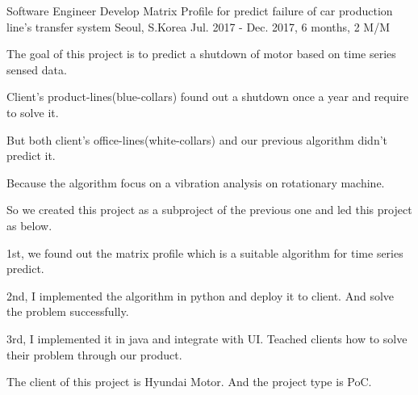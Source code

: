 \begin{cventries}
  \cventry
    {Software Engineer} %
    {Develop Matrix Profile for predict failure of car production line's transfer system} %
    {Seoul, S.Korea} %
    {Jul. 2017 - Dec. 2017, 6 months, 2 M/M} %
    {
      \begin{cvitems} %
        \item {The goal of this project is to predict a shutdown of motor based on time series sensed data.}
        \item {Client's product-lines(blue-collars) found out a shutdown once a year and require to solve it.}
        \item {But both client's office-lines(white-collars) and our previous algorithm didn't predict it.}
        \item {Because the algorithm focus on a vibration analysis on rotationary machine.}
        \item {So we created this project as a subproject of the previous one and led this project as below.}
        \item {1st, we found out the matrix profile which is a suitable algorithm for time series predict.}
        \item {2nd, I implemented the algorithm in python and deploy it to client. And solve the problem successfully.}
        \item {3rd, I implemented it in java and integrate with UI. Teached clients how to solve their problem through our product.}
        \item {The client of this project is Hyundai Motor. And the project type is PoC.}
      \end{cvitems}
    }


\end{cventries}
